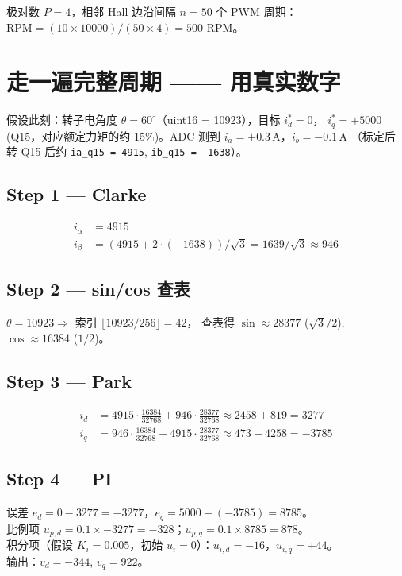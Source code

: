 \documentclass[UTF8,a4paper,11pt]{ctexart}
\newcommand{\code}[1]{\texttt{#1}}
\begin{document}
\begin{example}
极对数 $P=4$，相邻 Hall 边沿间隔 $n=50$ 个 PWM 周期：
$\text{RPM} = (10 \times 10000) / (50 \times 4) = 500$ RPM。
\end{example}

\section{走一遍完整周期 —— 用真实数字}

假设此刻：转子电角度 $\theta = 60^\circ$（uint16 = 10923），目标 $i_d^* = 0$，
$i_q^* = +5000$ (Q15，对应额定力矩的约 15\%)。ADC 测到 $i_a = +0.3$\,A，$i_b = -0.1$\,A
（标定后转 Q15 后约 \code{ia\_q15 = 4915}, \code{ib\_q15 = -1638}）。

\subsection*{Step 1 — Clarke}
\begin{align*}
i_\alpha &= 4915 \\
i_\beta  &= (4915 + 2 \cdot (-1638))/\sqrt 3 = 1639/\sqrt 3 \approx 946
\end{align*}

\subsection*{Step 2 — sin/cos 查表}
$\theta = 10923 \Rightarrow$ 索引 $\lfloor 10923 / 256 \rfloor = 42$，
查表得 $\sin \approx 28377$ ($\sqrt 3/2$), $\cos \approx 16384$ ($1/2$)。

\subsection*{Step 3 — Park}
\begin{align*}
i_d &= 4915 \cdot \tfrac{16384}{32768} + 946 \cdot \tfrac{28377}{32768}
     \approx 2458 + 819 = 3277 \\
i_q &= 946 \cdot \tfrac{16384}{32768} - 4915 \cdot \tfrac{28377}{32768}
     \approx 473 - 4258 = -3785
\end{align*}

\subsection*{Step 4 — PI}

误差 $e_d = 0 - 3277 = -3277$，$e_q = 5000 - (-3785) = 8785$。\\
比例项 $u_{p,d} = 0.1 \times -3277 = -328$；$u_{p,q} = 0.1 \times 8785 = 878$。\\
积分项（假设 $K_i = 0.005$，初始 $u_i = 0$）：$u_{i,d} = -16$，$u_{i,q} = +44$。\\
输出：$v_d = -344$, $v_q = 922$。
\end{document}
